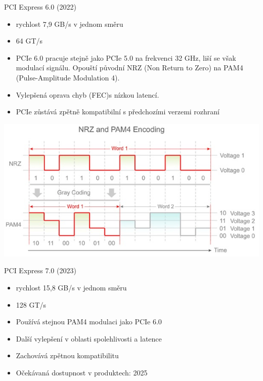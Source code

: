 \documentclass[aspectratio=43]{beamer}
\begin{document}
\begin{frame}{PCI Express 6.0 (2022)}
	\begin{itemize}
		\item rychlost 7,9 GB/s v jednom směru
		\item 64 GT/s
		\item PCIe 6.0 pracuje stejně jako PCIe 5.0 na frekvenci 32 GHz, liší se však modulací signálu. Opouští původní NRZ (Non Return to Zero) na PAM4 (Pulse-Amplitude Modulation 4).
		\item Vylepšená oprava chyb (FEC)s nízkou latencí.
		\item PCIe zůstává zpětně kompatibilní s předchozími verzemi rozhraní
	\end{itemize}
	\begin{center}
		\includegraphics[width=0.7\linewidth]{extrahovane_obrazky/pam4.jpg}
	\end{center}
	
\end{frame}

\begin{frame}{PCI Express 7.0 (2023)}
\begin{itemize}
    \item rychlost 15,8 GB/s v jednom směru
    \item 128 GT/s
    \item Používá stejnou PAM4 modulaci jako PCIe 6.0
    \item Další vylepšení v oblasti spolehlivosti a latence
    \item Zachovává zpětnou kompatibilitu
    \item Očekávaná dostupnost v produktech: 2025
\end{itemize}
\end{frame}
\end{document}
